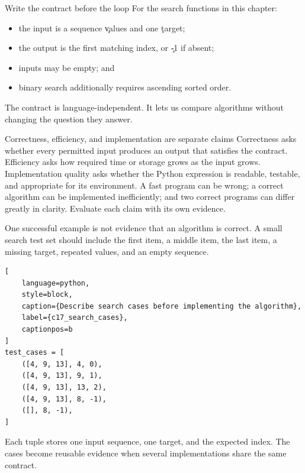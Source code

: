 \begin{SyntaxBox}{Write the contract before the loop}
For the search functions in this chapter:
\begin{itemize}
    \item the input is a sequence \c{values} and one \c{target};
    \item the output is the first matching index, or \c{-1} if absent;
    \item inputs may be empty; and
    \item binary search additionally requires ascending sorted order.
\end{itemize}
The contract is language-independent. It lets us compare algorithms without
changing the question they answer.
\end{SyntaxBox}

\begin{ExplainBox}{Correctness, efficiency, and implementation are separate claims}
Correctness asks whether every permitted input produces an output that satisfies
the contract. Efficiency asks how required time or storage grows as the input
grows. Implementation quality asks whether the Python expression is readable,
testable, and appropriate for its environment. A fast program can be wrong; a
correct algorithm can be implemented inefficiently; and two correct programs
can differ greatly in clarity. Evaluate each claim with its own evidence.
\end{ExplainBox}


One successful example is not evidence that an algorithm is correct. A small
search test set should include the first item, a middle item, the last item, a
missing target, repeated values, and an empty sequence.

\begin{lstlisting}[
    language=python,
    style=block,
    caption={Describe search cases before implementing the algorithm},
    label={c17_search_cases},
    captionpos=b
]
test_cases = [
    ([4, 9, 13], 4, 0),
    ([4, 9, 13], 9, 1),
    ([4, 9, 13], 13, 2),
    ([4, 9, 13], 8, -1),
    ([], 8, -1),
]
\end{lstlisting}

Each tuple stores one input sequence, one target, and the expected index. The
cases become reusable evidence when several implementations share the same
contract.



